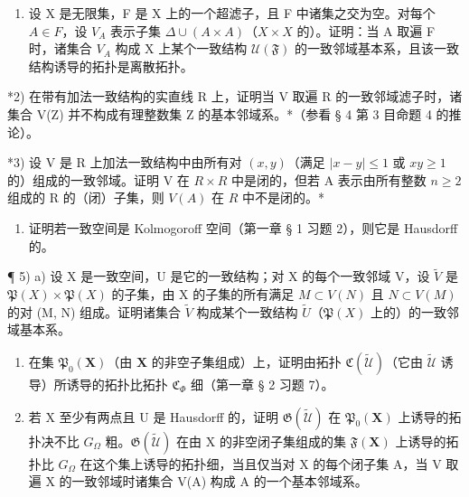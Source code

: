 \BourbakiExercises

\BourbakiExerciseGroup

\begin{enumerate}
\def\labelenumi{\arabic{enumi})}
\tightlist
\item
  设 X 是无限集，F 是 X 上的一个超滤子，且 F 中诸集之交为空。对每个 \(A \in F\)，设 \(V_{A}\) 表示子集 \(\Delta \cup (A \times A)\)（\(X \times X\) 的）。证明：当 A 取遍 F 时，诸集合 \(V_{A}\) 构成 X 上某个一致结构 \(\mathcal{U}(\mathfrak{F})\) 的一致邻域基本系，且该一致结构诱导的拓扑是离散拓扑。
\end{enumerate}

*2) 在带有加法一致结构的实直线 R 上，证明当 V 取遍 R 的一致邻域滤子时，诸集合 V(Z) 并不构成有理整数集 Z 的基本邻域系。*（参看 § 4 第 3 目命题 4 的推论）。

*3) 设 V 是 R 上加法一致结构中由所有对 \((x, y)\)（满足 \(|x - y| \leqslant 1\) 或 \(xy \geqslant 1\) 的）组成的一致邻域。证明 V 在 \(R \times R\) 中是闭的，但若 A 表示由所有整数 \(n \geqslant 2\) 组成的 R 的（闭）子集，则 \(V(A)\) 在 \(R\) 中不是闭的。*

\begin{enumerate}
\def\labelenumi{\arabic{enumi})}
\setcounter{enumi}{3}
\tightlist
\item
  证明若一致空间是 Kolmogoroff 空间（第一章 § 1 习题 2），则它是 Hausdorff 的。
\end{enumerate}

¶ 5) a) 设 X 是一致空间，U 是它的一致结构；对 X 的每个一致邻域 V，设 \(\tilde{V}\) 是 \(\mathfrak{P}(X) \times \mathfrak{P}(X)\) 的子集，由 X 的子集的所有满足 \(M \subset V(N)\) 且 \(N \subset V(M)\) 的对 (M, N) 组成。证明诸集合 \(\tilde{V}\) 构成某个一致结构 \(\tilde{U}\)（\(\mathfrak{P}(X)\) 上的）的一致邻域基本系。

\begin{enumerate}
\def\labelenumi{\alph{enumi})}
\setcounter{enumi}{1}
\item
  在集 \(\mathfrak{P}_{0}(\mathbf{X})\)（由 \(\mathbf{X}\) 的非空子集组成）上，证明由拓扑 \(\mathfrak{C}(\tilde{\mathcal{U}})\)（它由 \(\tilde{\mathcal{U}}\) 诱导）所诱导的拓扑比拓扑 \(\mathfrak{C}_{\Phi}\) 细（第一章 § 2 习题 7）。
\item
  若 X 至少有两点且 U 是 Hausdorff 的，证明 \(\mathfrak{G}(\tilde{\mathcal{U}})\) 在 \(\mathfrak{P}_{0}(\mathbf{X})\) 上诱导的拓扑决不比 \(G_{\Omega}\) 粗。\(\mathfrak{G}(\tilde{\mathcal{U}})\) 在由 X 的非空闭子集组成的集 \(\mathfrak{F}(\mathbf{X})\) 上诱导的拓扑比 \(G_{\Omega}\) 在这个集上诱导的拓扑细，当且仅当对 X 的每个闭子集 A，当 V 取遍 X 的一致邻域时诸集合 V(A) 构成 A 的一个基本邻域系。
\end{enumerate}

